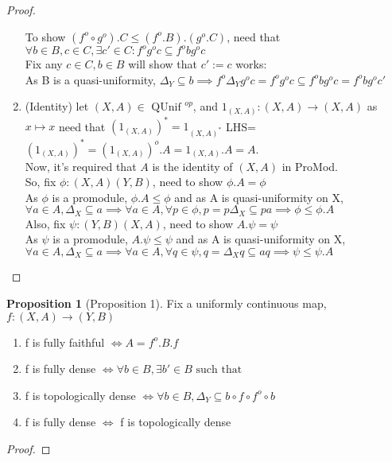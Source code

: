\documentclass[18pt,a4paper]{article}
\makeatletter
\theoremstyle{definition}
\newtheorem{proop}{Proposition}[section]
\newcommand{\carrow}{}%
\DeclareRobustCommand{\carrow}{%
  \mathrel{\vphantom{\rightarrow}\mathpalette\circle@arrow\relax}%
}
\newcommand{\circle@arrow}[2]{%
  \m@th
  \ooalign{%
    \hidewidth$#1\circ\mkern1mu$\hidewidth\cr
    $#1\longrightarrow$\cr}%
}
\makeatother
\begin{document}
\begin{proof}
\begin{enumerate}[label=(\roman*)]
			To show $(f^o \circ g^o).C\leq(f^o .B).(g^o .C)$, need that
			$\forall b \in B, c \in C, \exists c' \in C: f^o g^o c \subseteq f^obg^oc $
			\\Fix any $c\in C, b\in B$ will show that $c':=c$ works:\\
			As B is a quasi-uniformity, $\Delta_Y \subseteq b\implies f^o \Delta_Y
			g^o c=f^o g^o c \subseteq f^o b	g^o c=f^o b g^o c'$
		\item(Identity) let $(X,A)\in \text{ QUnif }^{op} $, and
			$1_{(X,A)}:(X,A)\to(X,A)$ as $x\mapsto x$ need that
			$(1_{(X,A)})^*=1_{(X,A)^*}$
			LHS=$(1_{(X,A)})^*=(1_{(X,A)})^o.A=1_{(X,A)}.A=A$.
			\\Now, it's required that $A$ is the identity of $(X,A)$ in ProMod.\\
			So, fix $\phi:(X,A) \carrow (Y,B)$, need to show $\phi.A=\phi$\\
			As $\phi$ is a promodule, $\phi.A \leq \phi$ and as A is quasi-uniformity on X,\\
			$\forall a\in A, \Delta_X \subseteq a \implies
			\forall a \in A, \forall p \in \phi, p=p\Delta_X\subseteq pa \implies
			\phi \leq \phi.A$\\
			Also, fix $\psi:(Y,B) \carrow (X,A)$, need to show $A.\psi=\psi$\\
			As $\psi$ is a promodule, $A.\psi \leq \psi$ and as A is quasi-uniformity on X,\\
			$\forall a\in A, \Delta_X \subseteq a \implies
			\forall a \in A, \forall q \in \psi, q=\Delta_X q \subseteq aq \implies
			\psi \leq \psi.A$
	\end{enumerate}



\end{proof}


\begin{proop}[Proposition 1]
	Fix a uniformly continuous map, $f:(X,A) \rightarrow (Y,B)$
	\begin{enumerate}[label=(\alph*)]
		\item f is fully faithful $\iff A=f^o.B.f$
		\item f is fully dense $\iff \forall b\in B, \exists b' \in B \text{ such that }  $
		\item f is topologically dense $\iff\forall b\in B,\Delta_Y\subseteq b\circ f\circ f^o\circ b$
		\item f is fully dense $\iff$ f is topologically dense
	\end{enumerate}
\end{proop}
\begin{proof}

\end{proof}
\end{document}
